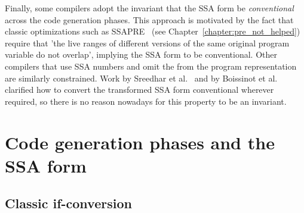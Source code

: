 Finally, some compilers adopt the invariant that the SSA form be
\emph{conventional} across the code generation phases. This approach is
motivated by the fact that classic optimizations such as SSAPRE~\cite{Kennedy:1999:TOPLAS} (see Chapter~\ref{chapter:pre_not_helped}) require that 'the live ranges of different versions
of the same original program variable do not overlap', implying the SSA form to be
conventional. Other compilers that use SSA numbers and omit the \phifuns
from the program representation~\cite{Lapkowski:1996:CASCON} are similarly
constrained. Work by Sreedhar et al.~\cite{Sreedhar:1999:SAS} and by Boissinot
et al.~\cite{Boissinot:2009:CGO} clarified how to convert the transformed SSA
form conventional wherever required, so there is no reason nowadays for this
property to be an invariant.



\section{Code generation phases and the SSA form}
\label{sec:ssa-codegen-suitability}

\begin{comment}

\subsection{Instruction selection}

Instruction selection (Chapter~\ref{chapter:code_selection}). Unlike
classic techniques that match one IR tree or one DAG at a time, using the SSA
form as input extends the scope of pattern matching to more complex IR graphs,
in particular those resulting from control-flow constructs.

\end{comment}

\subsection{Classic if-conversion}

